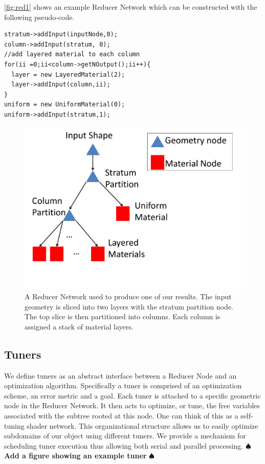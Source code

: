 \documentclass[annual]{acmsiggraph}
\newcommand{\note}[1]{\marginpar{\LARGE $\spadesuit$}
			$\spadesuit$ {\bf #1} $\spadesuit$}
\begin{document}
\autoref{fig:red1} shows an example Reducer Network which can be constructed with the following pseudo-code.
\begin{verbatim}
stratum->addInput(inputNode,0);
column->addInput(stratum, 0);
//add layered material to each column
for(ii =0;ii<column->getNOutput();ii++){
  layer = new LayeredMaterial(2);
  layer->addInput(column,ii);
}
uniform = new UniformMaterial(0);
uniform->addInput(stratum,1);
\end{verbatim}

\begin{figure}[h]
\includegraphics[scale=0.3]{figure/redNetwork.pdf}
\caption{A Reducer Network used to produce one of our results.
The input geometry is sliced into two layers with the stratum partition node.
The top slice is then partitioned into columns. Each column is assigned
a stack of material layers.}
\label{fig:red1}
\end{figure}

\subsection{Tuners}
We define tuners as an abstract interface between a Reducer Node and an optimization algorithm.  Specifically a tuner is comprised of an optimization scheme, an error metric and a goal. Each tuner is attached to a specific geometric node in the Reducer Network. It then acts to optimize, or tune, the free variables associated with the subtree rooted at this node. One can think of this as a self-tuning shader network.  This organizational structure allows us to easily optimize subdomains of our object using different tuners. We provide a mechanism for scheduling tuner execution thus allowing both serial and parallel processing. \note{Add a figure showing an example tuner}
\end{document}
